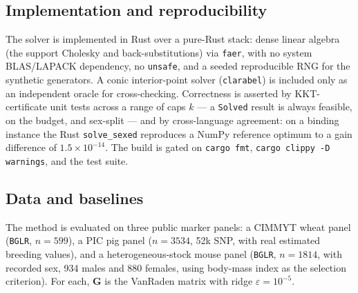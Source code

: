 \documentclass[11pt]{article}
\newcommand{\bG}{\mathbf{G}}
\begin{document}
\subsection{Implementation and reproducibility}

The solver is implemented in Rust over a pure-Rust stack: dense linear algebra (the support Cholesky and back-substitutions) via \texttt{faer}, with no system BLAS/LAPACK dependency, no \texttt{unsafe}, and a seeded reproducible RNG for the synthetic generators. A conic interior-point solver (\texttt{clarabel}) is included only as an independent oracle for cross-checking. Correctness is asserted by KKT-certificate unit tests across a range of caps $k$ --- a \texttt{Solved} result is always feasible, on the budget, and sex-split --- and by cross-language agreement: on a binding instance the Rust \texttt{solve\_sexed} reproduces a NumPy reference optimum to a gain difference of $1.5\times10^{-14}$. The build is gated on \texttt{cargo fmt}, \texttt{cargo clippy -D warnings}, and the test suite.

\subsection{Data and baselines}

The method is evaluated on three public marker panels: a CIMMYT wheat panel (\texttt{BGLR}, $n=599$), a PIC pig panel ($n=3534$, 52k SNP, with real estimated breeding values), and a heterogeneous-stock mouse panel (\texttt{BGLR}, $n=1814$, with recorded sex, 934 males and 880 females, using body-mass index as the selection criterion). For each, $\bG$ is the VanRaden matrix with ridge $\varepsilon=10^{-5}$.
\end{document}
